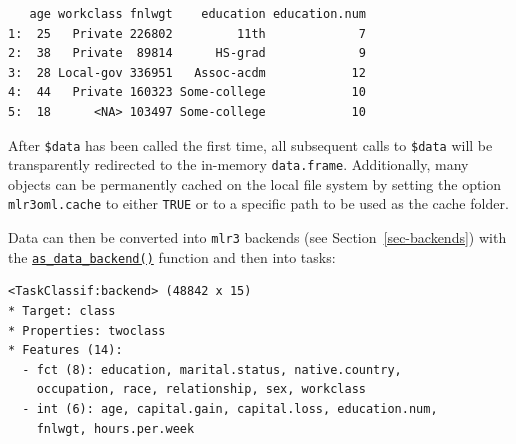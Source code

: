 \begin{verbatim}
   age workclass fnlwgt    education education.num
1:  25   Private 226802         11th             7
2:  38   Private  89814      HS-grad             9
3:  28 Local-gov 336951   Assoc-acdm            12
4:  44   Private 160323 Some-college            10
5:  18      <NA> 103497 Some-college            10
\end{verbatim}

\begin{tcolorbox}[enhanced jigsaw, opacitybacktitle=0.6, rightrule=.15mm, opacityback=0, arc=.35mm, breakable, titlerule=0mm, colframe=quarto-callout-tip-color-frame, coltitle=black, bottomrule=.15mm, toprule=.15mm, colback=white, colbacktitle=quarto-callout-tip-color!10!white, bottomtitle=1mm, toptitle=1mm, title=\textcolor{quarto-callout-tip-color}{\faLightbulb}\hspace{0.5em}{mlr3oml Cache}, leftrule=.75mm, left=2mm]

After \texttt{\$data} has been called the first time, all subsequent
calls to \texttt{\$data} will be transparently redirected to the
in-memory \texttt{data.frame}. Additionally, many objects can be
permanently cached on the local file system by setting the option
\texttt{mlr3oml.cache} to either \texttt{TRUE} or to a specific path to
be used as the cache folder.

\end{tcolorbox}

Data can then be converted into \texttt{mlr3} backends (see
Section~\ref{sec-backends}) with the
\href{https://mlr3.mlr-org.com/reference/as_data_backend.Matrix.html}{\texttt{as\_data\_backend()}}
function and then into tasks:

\begin{Shaded}
\begin{Highlighting}[]
\OtherTok{=} 
\OtherTok{=}  \NormalTok{)}
\end{Highlighting}
\end{Shaded}

\begin{verbatim}
<TaskClassif:backend> (48842 x 15)
* Target: class
* Properties: twoclass
* Features (14):
  - fct (8): education, marital.status, native.country,
    occupation, race, relationship, sex, workclass
  - int (6): age, capital.gain, capital.loss, education.num,
    fnlwgt, hours.per.week
\end{verbatim}

